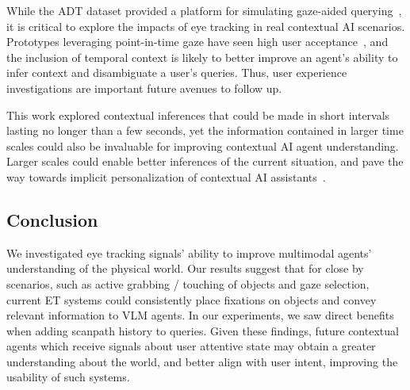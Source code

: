 While the ADT dataset provided a platform for simulating gaze-aided querying~\cite{pan_adt_2023}, it is critical to explore the impacts of eye tracking in real contextual AI scenarios.  Prototypes leveraging point-in-time gaze have seen high user acceptance~\cite{konrad_gazegpt_2024, wang_gvoila_2024}, and the inclusion of temporal context is likely to better improve an agent's ability to infer context and disambiguate a user's queries.  Thus, user experience investigations are important future avenues to follow up.

This work explored contextual inferences that could be made in short intervals lasting no longer than a few seconds, yet the information contained in larger time scales could also be invaluable for improving contextual AI agent understanding.  Larger scales could enable better inferences of the current situation, and pave the way towards implicit personalization of contextual AI assistants~\cite{pardini_role_2022}.

\subsection{Conclusion}

We investigated eye tracking signals' ability to improve multimodal agents' understanding of the physical world.  Our results suggest that for close by scenarios, such as active grabbing / touching of objects and gaze selection, current ET systems could consistently place fixations on objects and convey relevant information to VLM agents.  In our experiments, we saw direct benefits when adding scanpath history to queries. Given these findings, future contextual agents which receive signals about user attentive state may obtain a greater understanding about the world, and better align with user intent, improving the usability of such systems.

